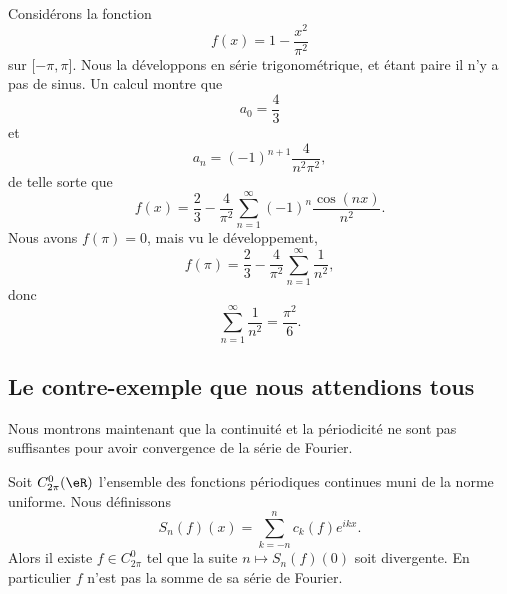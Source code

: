 \begin{example}
    Considérons la fonction
    \begin{equation}
        f(x)=1-\frac{ x^2 }{ \pi^2 }
    \end{equation}
    sur \( \mathopen[ -\pi , \pi \mathclose]\). Nous la développons en série trigonométrique, et étant paire il n'y a pas de sinus. Un calcul montre que
    \begin{equation}
        a_0=\frac{ 4 }{ 3 }
    \end{equation}
    et
    \begin{equation}
        a_n=(-1)^{n+1}\frac{ 4 }{ n^2\pi^2 },
    \end{equation}
    de telle sorte que
    \begin{equation}
        f(x)=\frac{ 2 }{ 3 }-\frac{ 4 }{ \pi^2 }\sum_{n=1}^{\infty}(-1)^n\frac{ \cos(nx) }{ n^2 }.
    \end{equation}
    Nous avons \( f(\pi)=0\), mais vu le développement,
    \begin{equation}
        f(\pi)=\frac{ 2 }{ 3 }-\frac{ 4 }{ \pi^2 }\sum_{n=1}^{\infty}\frac{1}{ n^2 },
    \end{equation}
    donc
    \begin{equation}
        \sum_{n=1}^{\infty}\frac{1}{ n^2 }=\frac{ \pi^2 }{ 6 }.
    \end{equation}
\end{example}

\subsection{Le contre-exemple que nous attendions tous}

Nous montrons maintenant que la continuité et la périodicité ne sont pas suffisantes pour avoir convergence de la série de Fourier.

\begin{proposition} \label{PropREkHdol}
    Soit \( C^0_{2\pi}(\eR)\) l'ensemble des fonctions périodiques continues muni de la norme uniforme. Nous définissons
    \begin{equation}
        S_n(f)(x)=\sum_{k=-n}^nc_k(f) e^{ikx}.
    \end{equation}
    Alors il existe \( f\in C^0_{2\pi}\) tel que la suite \(n\mapsto S_n(f)(0)\) soit divergente. En particulier \( f\) n'est pas la somme de sa série de Fourier.
\end{proposition}

